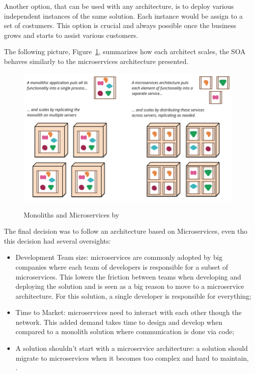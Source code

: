 Another option, that can be used with any architecture, is to deploy various independent instances of the same solution. Each instance would be assign to a set of costumers. This option is crucial and always possible once the business grows and starts to assist various customers.

The following picture, Figure~\ref{fig:design:alternatives:auth:backend:scale}, summarizes how each architect scales, the \gls{SOA} behaves similarly to the microservices architecture presented.

\begin{figure}[H]
   \centering
   \resizebox{\columnwidth}{!}
   {
      \includegraphics{assets/figures/microservices.png}
   }
   \caption[Monoliths and Microservices]{Monoliths and Microservices by \cite{martinmicro}}
   \label{fig:design:alternatives:auth:backend:scale}
\end{figure}

The final decision was to follow an architecture based on Microservices, even tho this decision had several oversights:

\begin{itemize}
   \item Development Team size: microservices are commonly adopted by big companies where each team of developers is responsible for a subset of microservices. This lowers the friction between teams when developing and deploying the solution and is seen as a big reason to move to a microservice architecture. For this solution, a single developer is responsible for everything;
   \item Time to Market: microservices need to interact with each other though the network. This added demand takes time to design and develop when compared to a monolith solution where communication is done via code;
   \item A solution shouldn't start with a microservice architecture: a solution should migrate to microservices when it becomes too complex and hard to maintain, \cite{ibmmicro}.
\end{itemize}

